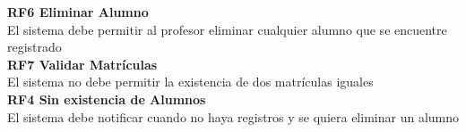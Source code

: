 \textbf{RF6 \hspace{2cm}Eliminar Alumno}\\
El sistema debe permitir al profesor eliminar cualquier alumno que se encuentre registrado\\

\textbf{RF7 \hspace{2cm}Validar Matrículas}\\
El sistema no debe permitir la existencia de dos matrículas iguales\\

\textbf{RF4 \hspace{2cm}Sin existencia de Alumnos}\\
El sistema debe notificar cuando no haya registros y se quiera eliminar un alumno\\








